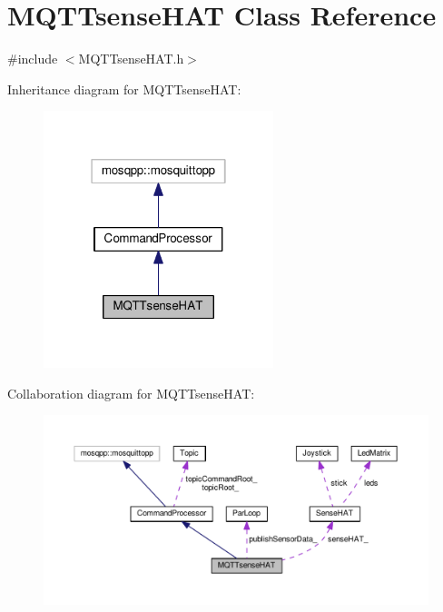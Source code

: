 \hypertarget{class_m_q_t_tsense_h_a_t}{}\section{M\+Q\+T\+Tsense\+H\+AT Class Reference}
\label{class_m_q_t_tsense_h_a_t}


{\ttfamily \#include $<$M\+Q\+T\+Tsense\+H\+A\+T.\+h$>$}



Inheritance diagram for M\+Q\+T\+Tsense\+H\+AT\+:\nopagebreak
\begin{figure}[H]
\begin{center}
\leavevmode
\includegraphics[width=190pt]{class_m_q_t_tsense_h_a_t__inherit__graph}
\end{center}
\end{figure}


Collaboration diagram for M\+Q\+T\+Tsense\+H\+AT\+:\nopagebreak
\begin{figure}[H]
\begin{center}
\leavevmode
\includegraphics[width=350pt]{class_m_q_t_tsense_h_a_t__coll__graph}
\end{center}
\end{figure}
